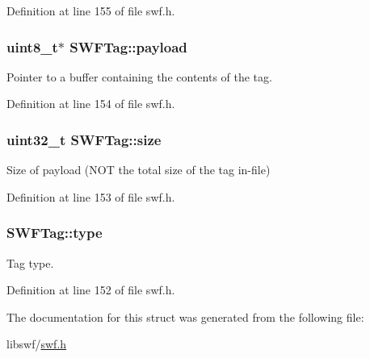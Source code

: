 Definition at line 155 of file swf.\-h.

\hypertarget{struct_s_w_f_tag_a71d91ae229304ea8ee7ed56636d3aa18}{
\subsubsection[{payload}]{\setlength{\rightskip}{0pt plus 5cm}uint8\-\_\-t$\ast$ S\-W\-F\-Tag\-::payload}}\label{struct_s_w_f_tag_a71d91ae229304ea8ee7ed56636d3aa18}


Pointer to a buffer containing the contents of the tag. 



Definition at line 154 of file swf.\-h.

\hypertarget{struct_s_w_f_tag_a17e4a212bb86a411cec95574ec263815}{
\subsubsection[{size}]{\setlength{\rightskip}{0pt plus 5cm}uint32\-\_\-t S\-W\-F\-Tag\-::size}}\label{struct_s_w_f_tag_a17e4a212bb86a411cec95574ec263815}


Size of payload (N\-O\-T the total size of the tag in-\/file) 



Definition at line 153 of file swf.\-h.

\hypertarget{struct_s_w_f_tag_adb10fb48757369896fd9c41e47a59f44}{
\subsubsection[{type}]{ S\-W\-F\-Tag\-::type}}\label{struct_s_w_f_tag_adb10fb48757369896fd9c41e47a59f44}


Tag type. 



Definition at line 152 of file swf.\-h.



The documentation for this struct was generated from the following file\-:\begin{DoxyCompactItemize}
\item 
libswf/\hyperlink{swf_8h}{swf.\-h}\end{DoxyCompactItemize}
